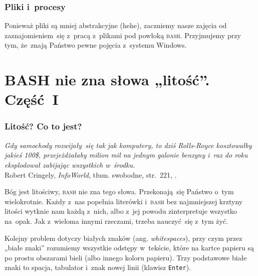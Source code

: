 \documentclass[10pt,t]{beamer}
\begin{document}
\begin{frame}
  \frametitle{Pliki i~procesy}


  Ponieważ pliki są mniej abstrakcyjne (hehe), zaczniemy nasze zajęcia od
  zaznajomieniem~się z~pracą z~plikami pod powłoką \textsc{bash}.
  Przyjmujemy przy tym, że~znają Państwo pewne pojęcia z~systemu Windows.

\end{frame}










\section{BASH nie zna słowa „litość”. Część~I}


\begin{frame}
  \frametitle{Litość? Co to jest?}


  \textit{Gdy samochody rozwijały~się tak jak komputery, to dziś
    Rolls-Royce kosztowałby jakieś 100\$, przejeżdżałaby milion mil na
    jednym galonie benzyny i~raz do roku eksplodował zabijając wszystkich
    w~środku.} \\
  Robert Cringely, \textit{InfoWorld}, tłum. swobodne, str.~221,
  \parencite{Garfinkel-Weise-Strassmann-The-UNIX-HATERS-Handbook-Pub-1994}.

  Bóg jest litościwy, \textsc{bash} nie zna tego słowa. Przekonają~się
  Państwo o~tym wielokrotnie. Każdy z~nas popełnia literówki i~\textsc{bash}
  bez najmniejszej krztyny litości wytknie nam każdą z~nich, albo
  z~jej powodu zinterpretuje wszystko na~opak. Jak z~wieloma innymi
  rzeczami, trzeba nauczyć~się z~tym żyć.

  Kolejny problem dotyczy białych znaków (ang. \textit{whitespaces}), przy
  czym przez „białe znaki” rozumiemy wszystkie odstępy w~tekście, które na
  kartce papieru są po prostu obszarami bieli (albo innego koloru papieru).
  Trzy podstawowe białe znaki to spacja, tabulator i~znak nowej linii
  (klawisz \texttt{Enter}).

\end{frame}
\end{document}
